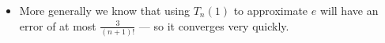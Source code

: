 \begin{eg}[More on $e^x$]
\begin{itemize}
\item More generally we know that using $T_n(1)$ to approximate $e$ will have an error of
at most $\frac{3}{(n+1)!}$ --- so it converges very quickly.
\end{itemize}



\end{eg}
